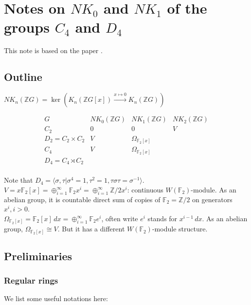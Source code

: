 \chapter{Notes on \texorpdfstring{$NK_0$}{NK0} and \texorpdfstring{$NK_1$}{NK1} of the groups \texorpdfstring{$C_4$}{C4} and \texorpdfstring{$D_4$}{D4}}
This note is based on the paper \cite{weibel2009nk0}.
\section{Outline}
\begin{definition}
$NK_n(\mathbb{Z}G)=\ker(K_n(\mathbb{Z}G[x])\overset{x\mapsto 0}\longrightarrow K_n(\mathbb{Z}G))$
\end{definition}
\begin{equation*}
	\begin{array}{c|c|c|c}
	G& NK_0(\mathbb{Z}G) & NK_1(\mathbb{Z}G) &NK_2(\mathbb{Z}G) \\
	\hline
	C_2 & 0 & 0&V \\
	\hline
	D_2=C_2\times C_2&V&\Omega_{\mathbb{F}_2[x]} & \\
	\hline
	C_4 & V&\Omega_{\mathbb{F}_2[x]} & \\
	\hline
	D_4=C_4\rtimes C_2&  &\\
	\end{array}
\end{equation*}

Note that $D_4=\langle \sigma, \tau|\sigma^4=1,\tau^2=1,\tau \sigma \tau=\sigma^{-1} \rangle$.\\
$V=x \mathbb{F}_2[x]=\oplus_{i=1}^\infty \mathbb{F}_2 x^i = \oplus_{i=1}^\infty \mathbb{Z}/2 x^i$: continuous $W(\mathbb{F}_2)$-module. As an abelian group, it is countable direct sum of copies of $\mathbb{F}_2=\mathbb{Z}/2$ on generators $x^i,i>0$.\\
$\Omega_{\mathbb{F}_2[x]}= \mathbb{F}_2[x]\,dx = \oplus_{i=1}^\infty \mathbb{F}_2 e^i $, often write $e^i$ stands for $x^{i-1}\, dx$. As an abelian group, $\Omega_{\mathbb{F}_2[x]}\cong V$. But it has a different $W(\mathbb{F}_2)$-module structure.

\section{Preliminaries}
\subsection{Regular rings} %
\label{sub:regular_rings}
We list some useful notations here:

